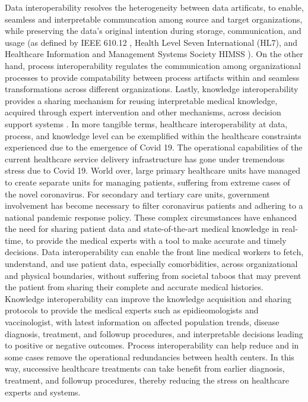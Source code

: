 \documentclass{ieeeaccess}
\begin{document}
Data interoperability resolves the heterogeneity between data artificats, to enable, seamless and interpretable communcation among source and target organizations, while preserving the data's original intention during storage, communication, and usage (as defined by IEEE 610.12 \cite{geraci1991ieee}, Health Level Seven International (HL7), and Healthcare Information and Management Systems Society HIMSS \cite{Himss_url2013}).
On the other hand, process interoperability regulates the communication among organizational processes to provide compatability between process artifacts within and seamless transformations across different organizations\cite{khan2013process}. Lastly, knowledge interoperability provides a sharing mechanism for reusing interpretable medical knowledge, acquired through expert intervention and other mechanisms, across decision support systems \cite{ali2017multi}.
In more tangible terms, healthcare interoperability at data, process, and knowledge level can be exemplified within the healthcare constraints experienced due to the emergence of Covid 19. The operational capabilities of the current healthcare service delivery infrastructure has gone under tremendous stress due to Covid 19. World over, large primary healthcare units have managed to create separate units for managing patients, suffering from extreme cases of the novel coronavirus. For secondary and tertiary care units, government involvement has become necessary to filter coronavirus patients and adhering to a national pandemic response policy. 
These complex circumstances have enhanced the need for sharing patient data and state-of-the-art medical knowledge in real-time, to provide the medical experts with a tool to make accurate and timely decisions.
Data interoperability can enable the front line medical workers to fetch, understand, and use patient data, especially comorbidities, across organizational and physical boundaries, without suffering from societal taboos that may prevent the patient from sharing their complete and accurate medical histories. Knowledge interoperability can improve the knowledge acquisition and sharing protocols to provide the medical experts such as epidieomologists and vaccinologist, with latest information on affected population trends, disease diagnosis, treatment, and followup procedures, and interpretable decisions leading to positive or negative outcomes. Process interoperability can help reduce and in some cases remove the operational redundancies between health centers. In this way, successive healthcare treatments can take benefit from earlier diagnosis, treatment, and followup procedures, thereby reducing the stress on healthcare experts and systems.
\end{document}
